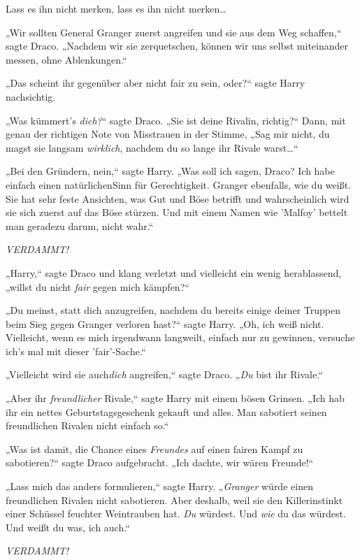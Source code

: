 {Lass es ihn nicht merken, lass es ihn nicht merken…

„Wir sollten General Granger zuerst angreifen und sie aus dem Weg schaffen,“ sagte Draco. „Nachdem wir sie zerquetschen, können wir uns selbst miteinander messen, ohne Ablenkungen.“

„Das scheint ihr gegenüber aber nicht fair zu sein, oder?“ sagte Harry nachsichtig.

„Was kümmert's \emph{dich?}“ sagte Draco. „Sie ist deine Rivalin, richtig?“ Dann, mit genau der richtigen Note von Misstrauen in der Stimme, „Sag mir nicht, du magst sie langsam \emph{wirklich}, nachdem du so lange ihr Rivale warst…“

„Bei den Gründern, nein,“ sagte Harry. „Was soll ich sagen, Draco? Ich habe einfach einen natürlichenSinn für Gerechtigkeit. Granger ebenfalls, wie du weißt. Sie hat sehr feste Ansichten, was Gut und Böse betrifft und wahrscheinlich wird sie sich zuerst auf das Böse stürzen. Und mit einem Namen wie 'Malfoy' bettelt man geradezu darum, nicht wahr.“

\emph{VERDAMMT!}

„Harry,“ sagte Draco und klang verletzt und vielleicht ein wenig herablassend, „willst du nicht \emph{fair} gegen mich kämpfen?“

„Du meinst, statt dich anzugreifen, nachdem du bereits einige deiner Truppen beim Sieg gegen Granger verloren hast?“ sagte Harry. „Oh, ich weiß nicht. Vielleicht, wenn es mich irgendwann langweilt, einfach nur zu gewinnen, versuche ich's mal mit dieser 'fair'-Sache.“

„Vielleicht wird sie auch\emph{dich} angreifen,“ sagte Draco. „\emph{Du} bist ihr Rivale.“

„Aber ihr \emph{freundlicher} Rivale,“ sagte Harry mit einem bösen Grinsen. „Ich hab ihr ein nettes Geburtstagsgeschenk gekauft und alles. Man sabotiert seinen freundlichen Rivalen nicht einfach so.“

„Was ist damit, die Chance eines \emph{Freundes} auf einen fairen Kampf zu sabotieren?“ sagte Draco aufgebracht. „Ich dachte, wir wären Freunde!“

„Lass mich das anders formulieren,“ sagte Harry. „\emph{Granger} würde einen freundlichen Rivalen nicht sabotieren. Aber deshalb, weil sie den Killerinstinkt einer Schüssel feuchter Weintrauben hat. \emph{Du} würdest. Und \emph{wie} du das würdest. Und weißt du was, ich auch.“

\emph{VERDAMMT!}

\later

}
